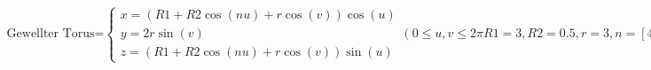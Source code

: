 \documentclass[preview]{standalone}
\begin{document}
\begin{align*}
\text{Gewellter Torus=}\begin{cases} x=(R1+R2\cos(nu)+r\cos(v))\cos(u) \\ y = 2r\sin(v) \\ z = (R1+R2\cos(nu)+r\cos(v))\sin(u) \end{cases}  (0 \leq u,v \leq 2\pi R1=3,R2=0.5,r=3,n=[4,6,8,10])
\end{align*}
\end{document}
